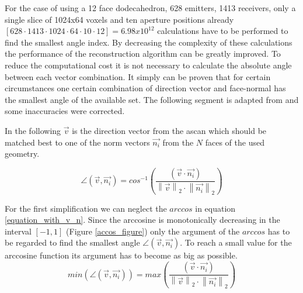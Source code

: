 
For the case of using a 12 face dodecahedron, 628 emitters, 1413 receivers, only a single slice of 1024x64 voxels and ten aperture positions already $[628 \cdot 1413 \cdot 1024 \cdot 64 \cdot 10 \cdot 12] = 6.98x10^{12}$ calculations have to be  performed to find the smallest angle index. By decreasing the complexity of these calculations the performance of the reconstruction algorithm can be greatly improved. To reduce the computational cost it is not necessary to calculate the absolute angle between each vector combination. It simply can be proven that for certain circumstances one certain combination of direction vector and face-normal has the smallest angle of the available set. The following segment is adapted from \cite{PatrickHucker2014EvaluationRuckstreumodells} and some inaccuracies were corrected.

\qquad

In the following $\overrightarrow{v}$ is the direction vector from the \ac{ascan} which should be matched best to one of the norm vectors $\overrightarrow{n_i}$ from the $N$ faces of the used geometry.


\begin{equation}
\angle (\overrightarrow{v},\overrightarrow{n_i}) =  cos^{-1}\left (    \frac{(\overrightarrow{v} \cdot \overrightarrow{n_i})}{\left \| \overrightarrow{v} \right \|_2  \cdot {\left \| \overrightarrow{n_i} \right \|_2}}  \right ) 
\label{equation_with_v_n}
\end{equation}



For the first simplification we can neglect the $arccos$ in equation \ref{equation_with_v_n}. Since the arccosine is monotonically decreasing in the interval $[-1,1]$ (Figure \ref{accos_figure}) only the argument of the $arccos$ has to be regarded to find the smallest angle $\angle (\overrightarrow{v},\overrightarrow{n_i})$. To reach a small value for the arccosine function its argument has to become as big as possible.
\begin{equation}
min \left (  \angle (\overrightarrow{v},\overrightarrow{n_i}) \right ) =  max \left (    \frac{(\overrightarrow{v} \cdot \overrightarrow{n_i})}{\left \| \overrightarrow{v} \right \|_2  \cdot {\left \| \overrightarrow{n_i} \right \|_2}}  \right ) 
\label{equation_acos_neglect}
\end{equation}

